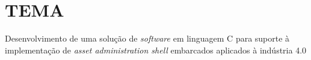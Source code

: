 \chapter{TEMA}
Desenvolvimento de uma solução de \textit{software} em linguagem C para suporte à implementação de \textit{asset administration shell} embarcados aplicados à indústria 4.0